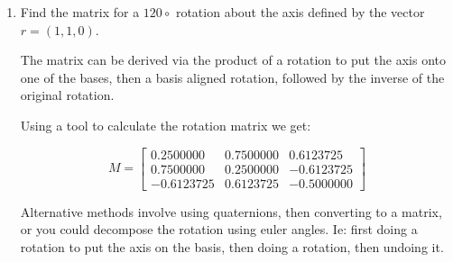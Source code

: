\documentclass{article}
\begin{document}
\begin{enumerate}
\begin{enumerate}
                \item 
                    \begin{displaymath}
                        M =
                        \begin{bmatrix}
                            1 & 0 & 3\\ 
                            0 & 1 & 2\\
                            0 & 0 & 1
                        \end{bmatrix}
                    \end{displaymath}
                    \begin{mdframed}
                        In a 2D projective space, this would
                        correspond to a translation by
                        $(3,2)$.
                    \end{mdframed}
            \end{enumerate}

        \item Find the matrix for a $120\circ$ rotation about the axis defined by the vector $r = (1,1,0)$.
            \begin{mdframed}
                The matrix can be derived via the product of a rotation to put the axis onto one of
                the bases, then a basis aligned rotation, followed by the inverse of the original rotation.

                Using a tool to calculate the rotation matrix we get:

                \begin{displaymath}
                    M = 
                    \begin{bmatrix}
                        0.2500000&  0.7500000&  0.6123725\\
                        0.7500000&  0.2500000& -0.6123725\\
                        -0.6123725&  0.6123725& -0.5000000 
                    \end{bmatrix}
                \end{displaymath}

                Alternative methods involve using quaternions,
                then converting to a matrix, or you could decompose
                the rotation using euler angles. Ie: first doing
                a rotation to put the axis on the basis, then doing
                a rotation, then undoing it.
            \end{mdframed}


\end{enumerate}
\end{document}
